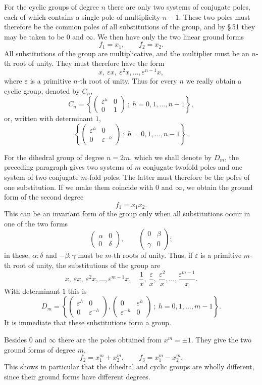 \documentclass[11pt]{article}
\providecommand{\eps}{\varepsilon}
\providecommand{\eps}{\varepsilon}
\providecommand{\mat}[4]{\begin{pmatrix}#1&#2\\#3&#4\end{pmatrix}}
\providecommand{\mat}[4]{\begin{pmatrix}#1&#2\\#3&#4\end{pmatrix}}
\begin{document}
For the cyclic groups of degree $n$ there are only two systems of conjugate poles, each of which contains a single pole of multiplicity $n-1$. These two poles must therefore be the common poles of all substitutions of the group, and by \S\,51 they may be taken to be $0$ and $\infty$. We then have only the two linear ground forms
\begin{equation}
 f_1=x_1,\qquad f_2=x_2 .
\tag{1}
\end{equation}
All substitutions of the group are multiplicative, and the multiplier must be an $n$-th root of unity. They must therefore have the form
\begin{equation}
 x,\ \eps x,\ \eps^2x,\ldots,\eps^{n-1}x,
\tag{2}
\end{equation}
where $\eps$ is a primitive $n$-th root of unity. Thus for every $n$ we really obtain a cyclic group, denoted by $C_n$,
\begin{equation}
 C_n=\left\{\mat{\eps^h}{0}{0}{1}\ ;\ h=0,1,\ldots,n-1\right\},
\tag{3}
\end{equation}
or, written with determinant $1$,
\[
 \left\{\mat{\eps^h}{0}{0}{\eps^{-h}}\ ;\ h=0,1,\ldots,n-1\right\}.
\]

For the dihedral group of degree $n=2m$, which we shall denote by $D_m$, the preceding paragraph gives two systems of $m$ conjugate twofold poles and one system of two conjugate $m$-fold poles. The latter must therefore be the poles of one substitution. If we make them coincide with $0$ and $\infty$, we obtain the ground form of the second degree
\begin{equation}
 f_1=x_1x_2 .
\tag{4}
\end{equation}
This can be an invariant form of the group only when all substitutions occur in one of the two forms
\[
 \mat{\alpha}{0}{0}{\delta},\qquad
 \mat{0}{\beta}{\gamma}{0};
\]
in these, $\alpha:\delta$ and $-\beta:\gamma$ must be $m$-th roots of unity. Thus, if $\eps$ is a primitive $m$-th root of unity, the substitutions of the group are
\[
x,\ \eps x,\ \eps^2x,\ldots,\eps^{m-1}x,\quad
\frac1x,\ \frac{\eps}{x},\ \frac{\eps^2}{x},\ldots,\frac{\eps^{m-1}}x .
\]
With determinant $1$ this is
\begin{equation}
D_m=\left\{
 \mat{\eps^h}{0}{0}{\eps^{-h}},
 \mat{0}{\eps^h}{\eps^{-h}}{0}
 \ ;\ h=0,1,\ldots,m-1
\right\}.
\tag{5}
\end{equation}
It is immediate that these substitutions form a group.

Besides $0$ and $\infty$ there are the poles obtained from $x^m=\pm1$. They give the two ground forms of degree $m$,
\begin{equation}
 f_2=x_1^m+x_2^m,\qquad
 f_3=x_1^m-x_2^m .
\tag{6}
\end{equation}
This shows in particular that the dihedral and cyclic groups are wholly different, since their ground forms have different degrees.
\end{document}
